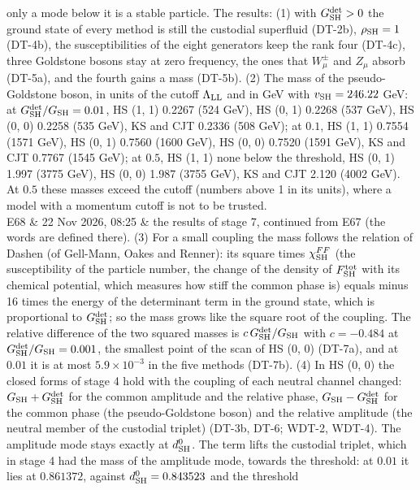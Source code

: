 \documentclass[
  10pt,
]{article}
\begin{document}
\begin{longtable}[]
only a mode below it is a stable particle. The results: (1) with
\(G^{\rm det}_{\rm SH}>0\) the ground state of every method is still the
custodial superfluid (DT-2b), \(\rho_{\rm SH}=1\) (DT-4b), the
susceptibilities of the eight generators keep the rank four (DT-4c),
three Goldstone bosons stay at zero frequency, the ones that
\(W^\pm_\mu\) and \(Z_\mu\) absorb (DT-5a), and the fourth gains a mass
(DT-5b). (2) The mass of the pseudo-Goldstone boson, in units of the
cutoff \(\Lambda_{\rm LL}\) and in GeV with \(v_{\rm SH}=246.22\) GeV:
at \(G^{\rm det}_{\rm SH}/G_{\rm SH}=0.01\), HS (1, 1) 0.2267 (524 GeV),
HS (0, 1) 0.2268 (537 GeV), HS (0, 0) 0.2258 (535 GeV), KS and CJT
0.2336 (508 GeV); at \(0.1\), HS (1, 1) 0.7554 (1571 GeV), HS (0, 1)
0.7560 (1600 GeV), HS (0, 0) 0.7520 (1591 GeV), KS and CJT 0.7767 (1545
GeV); at \(0.5\), HS (1, 1) none below the threshold, HS (0, 1) 1.997
(3775 GeV), HS (0, 0) 1.987 (3755 GeV), KS and CJT 2.120 (4002 GeV). At
\(0.5\) these masses exceed the cutoff (numbers above 1 in its units),
where a model with a momentum cutoff is not to be trusted. \\
E68 & 22 Nov 2026, 08:25 & the results of stage 7, continued from E67
(the words are defined there). (3) For a small coupling the mass follows
the relation of Dashen (of Gell-Mann, Oakes and Renner): its square
times \(\chi^{FF}_{\rm SH}\) (the susceptibility of the particle number,
the change of the density of \(F^{\rm tot}_{\rm SH}\) with its chemical
potential, which measures how stiff the common phase is) equals minus 16
times the energy of the determinant term in the ground state, which is
proportional to \(G^{\rm det}_{\rm SH}\); so the mass grows like the
square root of the coupling. The relative difference of the two squared
masses is \(c\,G^{\rm det}_{\rm SH}/G_{\rm SH}\) with \(c=-0.484\) at
\(G^{\rm det}_{\rm SH}/G_{\rm SH}=0.001\), the smallest point of the
scan of HS (0, 0) (DT-7a), and at \(0.01\) it is at most
\(5.9\times10^{-3}\) in the five methods (DT-7b). (4) In HS (0, 0) the
closed forms of stage 4 hold with the coupling of each neutral channel
changed: \(G_{\rm SH}+G^{\rm det}_{\rm SH}\) for the common amplitude
and the relative phase, \(G_{\rm SH}-G^{\rm det}_{\rm SH}\) for the
common phase (the pseudo-Goldstone boson) and the relative amplitude
(the neutral member of the custodial triplet) (DT-3b, DT-6; WDT-2,
WDT-4). The amplitude mode stays exactly at \(d^0_{\rm SH}\). The term
lifts the custodial triplet, which in stage 4 had the mass of the
amplitude mode, towards the threshold: at \(0.01\) it lies at
\(0.861372\), against \(d^0_{\rm SH}=0.843523\) and the threshold

\end{longtable}
\end{document}
